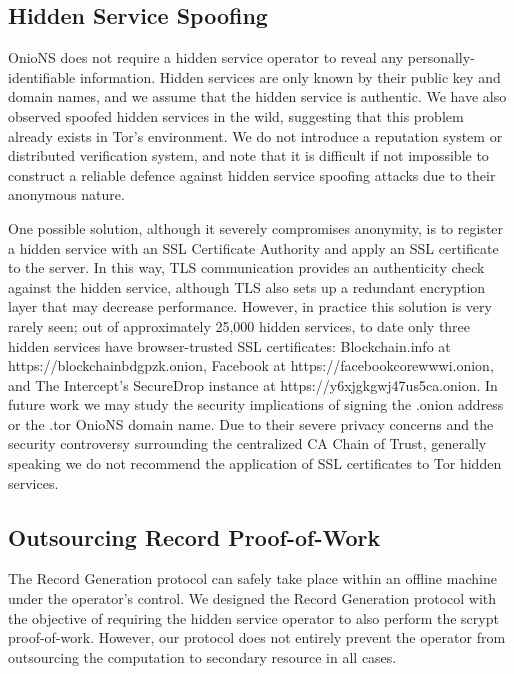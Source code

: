 \subsection{Hidden Service Spoofing}

OnioNS does not require a hidden service operator to reveal any personally-identifiable information. Hidden services are only known by their public key and domain names, and we assume that the hidden service is authentic. We have also observed spoofed hidden services in the wild, suggesting that this problem already exists in Tor's environment. We do not introduce a reputation system or distributed verification system, and note that it is difficult if not impossible to construct a reliable defence against hidden service spoofing attacks due to their anonymous nature. 

One possible solution, although it severely compromises anonymity, is to register a hidden service with an SSL Certificate Authority and apply an SSL certificate to the server. In this way, TLS communication provides an authenticity check against the hidden service, although TLS also sets up a redundant encryption layer that may decrease performance. However, in practice this solution is very rarely seen; out of approximately 25,000 hidden services\cite{TorMetrics}\cite{kadianakis2015extrapolating}, to date only three hidden services have browser-trusted SSL certificates: Blockchain.info at https://blockchainbdgpzk.onion, Facebook at https://facebookcorewwwi.onion, and The Intercept's SecureDrop instance at https://y6xjgkgwj47us5ca.onion. In future work we may study the security implications of signing the .onion address or the .tor OnioNS domain name. Due to their severe privacy concerns and the security controversy surrounding the centralized CA Chain of Trust, generally speaking we do not recommend the application of SSL certificates to Tor hidden services. 

\subsection{Outsourcing Record Proof-of-Work}


The Record Generation protocol can safely take place within an offline machine under the operator's control. We designed the Record Generation protocol with the objective of requiring the hidden service operator to also perform the scrypt proof-of-work. However, our protocol does not entirely prevent the operator from outsourcing the computation to secondary resource in all cases.

